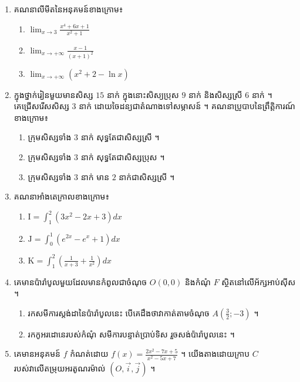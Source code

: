 \documentclass{officialexam}
\begin{document}
	{\maketitle}
	\begin{enumerate}[I]
		\item គណនាលីមីតនៃអនុគមន៍ខាងក្រោម៖
		\begin{enumerate}[k,3]
			\item $\lim_{x\to3}\frac{x^4+6x+1}{x^2+1}$
			\item $\lim_{x\to+\infty}\frac{x-1}{\left(x+1\right)^2}$
			\item $\lim_{x\to+\infty}\left(x^2+2-\ln x\right)$
		\end{enumerate}
		\item ក្នុងថ្នាក់រៀនមួយមានសិស្ស $15$ នាក់ ក្នុងនោះសិស្យប្រុស $9$ នាក់ និងសិស្សស្រី $6$ នាក់ ។ \\ 
		គេជ្រើសរើសសិស្ស $3$ នាក់ ដោយចៃដន្យជាតំណាងទៅសម្ភាសន៍ ។ គណនាប្រូបាបនៃព្រឹត្តិការណ៍ខាងក្រោម៖
		\begin{enumerate}[A]
			\item ក្រុមសិស្សទាំង $3$ នាក់ សុទ្ធតែជាសិស្សស្រី ។
			\item ក្រុមសិស្សទាំង $3$ នាក់ សុទ្ធតែជាសិស្សប្រុស ។
			\item ក្រុមសិស្សទាំង $3$ នាក់ មាន $2$ នាក់ជាសិស្សស្រី ។
		\end{enumerate}
		\item គណនាអាំងតេក្រាលខាងក្រោម៖ 
		\begin{enumerate}[k,3]
			\item $\mathrm{I}=\int_{1}^{2}\left(3x^2-2x+3\right)dx$
			\item $\mathrm{J}=\int_{0}^{1}\left(e^{2x}-e^x+1\right)dx$
			\item $\mathrm{K}=\int_{1}^{2}\left(\frac{1}{x+3}+\frac{1}{x^2}\right)dx$
		\end{enumerate}
		\item គេមានប៉ារ៉ាបូលមួយដែលមានកំពូលជាចំណុច $O\left(0,0\right)$ និងកំណុំ $F$ ស្ថិតនៅលើអ័ក្សអាប់ស៊ីស ។
		\begin{enumerate}[k]
			\item រកសមីការស្តង់ដានៃប៉ារ៉ាបូលនេះ បើគេដឹងថាវាកាត់តាមចំណុច $A\left(\frac{3}{2};-3\right)$ ។
			\item រកកូអរដោនេរបស់កំណុំ សមីការបន្ទាត់ប្រាប់ទិស រួចសង់ប៉ារ៉ាបូលនេះ ។
		\end{enumerate}
		\item គេមានអនុគមន៍ $f$ កំណត់ដោយ $f(x)=\frac{2x^2-7x+5}{x^2-5x+7}$ ។ យើងតាងដោយក្រាប $C$ របស់វាលើតម្រុយអរតូណរម៉ាល់ $\left(O, \vec{i}, \vec{j}\right)$ ។

\end{enumerate}
\end{document}

